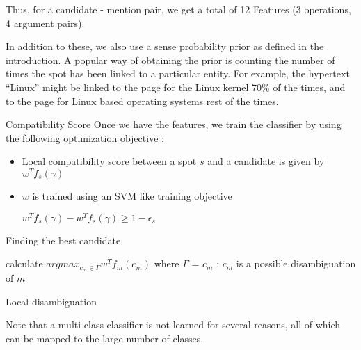  Thus, for a candidate - mention pair, we get a total of 12 Features (3 operations, 4 argument pairs). 
 
 In addition to these, we also use a sense probability prior as defined in the introduction. A popular way of 
 obtaining the prior is counting the number of times the spot has been linked to a particular entity. For example, 
 the hypertext ``Linux'' might be linked to the page for the Linux kernel 70\% of the times, and to the page
 for Linux based operating systems rest of the times.
 
 
\par{Compatibility Score}
Once we have the features, we train the classifier by using the following optimization objective : 
\begin{itemize}
 \item Local compatibility score between a spot $s$ and a candidate is given by $w^{T}f_s(\gamma)$
 \item $w$ is trained using an SVM like training objective
 \begin{center} $w^{T}f_s(\gamma) - w^{T}f_s(\gamma) \geq 1 - \epsilon_s$ \end{center}
 \end{itemize}
 
 \par{Finding the best candidate}

 \begin{algorithm*}
  {
  calculate $argmax_{c_m \in \Gamma}w^{T}f_m(c_m)$
  where $\Gamma$ = $c_m$ : $c_m$ is a possible disambiguation of $m$
 }\caption{Local disambiguation}
\end{algorithm*}

 Note that a multi class classifier is not learned for several reasons, all of which can be mapped to 
 the large number of classes. 